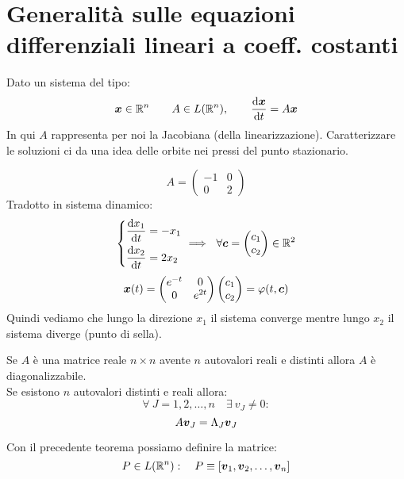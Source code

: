 \section{Generalità sulle equazioni differenziali lineari a coeff. costanti}%
\label{sub:Generalità sulle equazioni differenziali lineari a coeff. costanti}
Dato un sistema del tipo:
\[
    \boldsymbol{x}\in \mathbb{R}^n \qquad A \in L(\mathbb{R}^n), \qquad \frac{\text{d} \boldsymbol{x}}{\text{d} t} = A\boldsymbol{x}
\] 
In qui $A$  rappresenta per noi la Jacobiana (della linearizzazione). Caratterizzare le soluzioni ci da una idea delle orbite nei pressi del punto stazionario.
\begin{exmp}
    \[
	A = \begin{pmatrix} -1 & 0 \\ 0  & 2 \end{pmatrix} 
    \] 
    Tradotto in sistema dinamico:
    \[\begin{dcases}
        \frac{\text{d} x_1}{\text{d} t} = - x_1\\
	\frac{\text{d} x_2}{\text{d} t} = 2x_2
    \end{dcases}
    \implies  \ \forall \boldsymbol{c} = \begin{pmatrix} c_1 \\ c_2 \end{pmatrix} \in \mathbb{R}^2
\] 
    \[
        \boldsymbol{x} (t)= \begin{pmatrix} e^{-t} & 0 \\ 0 & e^{2t} \end{pmatrix} \begin{pmatrix} c_1 \\ c_2 \end{pmatrix} = \varphi (t, \boldsymbol{c})
    \] 
    Quindi vediamo che lungo la direzione $ x_1$ il sistema converge mentre lungo $x_2$ il sistema diverge (punto di sella). 
\end{exmp}
\noindent
\begin{thm}[Diagonabilizzabilità]
    Se $A$ è una matrice reale $n\times n$ avente $n$ autovalori reali e distinti allora $A$ è diagonalizzabile.\\
    Se esistono $n$ autovalori distinti e reali allora:
    \[
        \forall \ J = 1, 2, \ldots, n \quad \exists \ v_{J}\neq 0: 
    \] 
    \[
        A\boldsymbol{v}_J = \Lambda_J \boldsymbol{v}_J
    \] 
\end{thm}
\noindent
Con il precedente teorema possiamo definire la matrice:
\[
    P \in L (\mathbb{R}^n): \quad P \equiv \left[\boldsymbol{v}_1, \boldsymbol{v}_2, \ldots, \boldsymbol{v}_n\right]
\] 
